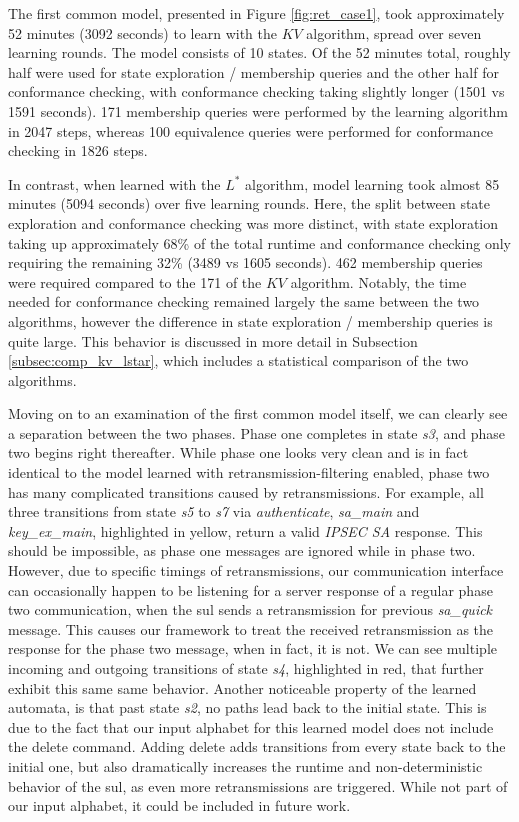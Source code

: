 The first common model, presented in Figure \ref{fig:ret_case1}, took approximately 52 minutes (3092 seconds) to learn with the $KV$ algorithm, spread over seven learning rounds. The model consists of 10 states. Of the 52 minutes total, roughly half were used for state exploration / membership queries and the other half for conformance checking, with conformance checking taking slightly longer (1501 vs 1591 seconds). 171 membership queries were performed by the learning algorithm in 2047 steps, whereas 100 equivalence queries were performed for conformance checking in 1826 steps.

In contrast, when learned with the $L^*$ algorithm, model learning took almost 85 minutes (5094 seconds) over five learning rounds. Here, the split between state exploration and conformance checking was more distinct, with state exploration taking up approximately 68\% of the total runtime and conformance checking only requiring the remaining 32\% (3489 vs 1605 seconds). 462 membership queries were required compared to the 171 of the $KV$ algorithm. Notably, the time needed for conformance checking remained largely the same between the two algorithms, however the difference in state exploration / membership queries is quite large. This behavior is discussed in more detail in Subsection \ref{subsec:comp_kv_lstar}, which includes a statistical comparison of the two algorithms.

Moving on to an examination of the first common model itself, we can clearly see a separation between the two phases. Phase one completes in state \emph{s3}, and phase two begins right thereafter. While phase one looks very clean and is in fact identical to the model learned with retransmission-filtering enabled, phase two has many complicated transitions caused by retransmissions. For example, all three transitions from state \emph{s5} to \emph{s7} via \emph{authenticate}, \emph{sa\_main} and \emph{key\_ex\_main}, highlighted in yellow, return a valid \emph{IPSEC SA} response. This should be impossible, as phase one messages are ignored while in phase two. However, due to specific timings of retransmissions, our communication interface can occasionally happen to be listening for a server response of a regular phase two communication, when the \ac{sul} sends a retransmission for previous \emph{sa\_quick} message. This causes our framework to treat the received retransmission as the response for the phase two message, when in fact, it is not. We can see multiple incoming and outgoing transitions of state \emph{s4}, highlighted in red, that further exhibit this same same behavior.
Another noticeable property of the learned automata, is that past state \emph{s2}, no paths lead back to the initial state. This is due to the fact that our input alphabet for this learned model does not include the delete command. Adding delete adds transitions from every state back to the initial one, but also dramatically increases the runtime and non-deterministic behavior of the \ac{sul}, as even more retransmissions are triggered. While not part of our input alphabet, it could be included in future work.

